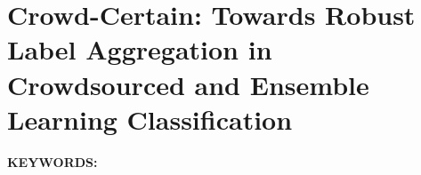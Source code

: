 \renewcommand{\figurepath}[1]{Chapters/crowd/figures/#1}

\chapter{Crowd-Certain: Towards Robust Label Aggregation in Crowdsourced and Ensemble Learning Classification}\label{ch:crowd}

%
\textbf{KEYWORDS:\ } %

\newpage

